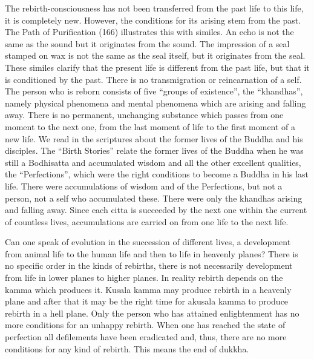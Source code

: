 \documentclass{book}
\begin{document}
The rebirth-consciousness has not been transferred from the past life to
this life, it is completely new. However, the conditions for its arising
stem from the past. The Path of Purification (166) illustrates this with
similes. An echo is not the same as the sound but it originates from the
sound. The impression of a seal stamped on wax is not the same as the
seal itself, but it originates from the seal. These similes clarify that
the present life is different from the past life, but that it is
conditioned by the past. There is no transmigration or reincarnation of
a self. The person who is reborn consists of five ``groups of
existence'', the ``khandhas'', namely physical phenomena and mental
phenomena which are arising and falling away. There is no permanent,
unchanging substance which passes from one moment to the next one, from
the last moment of life to the first moment of a new life. We read in
the scriptures about the former lives of the Buddha and his disciples.
The ``Birth Stories'' relate the former lives of the Buddha when he was
still a Bodhisatta and accumulated wisdom and all the other excellent
qualities, the ``Perfections'', which were the right conditions to
become a Buddha in his last life. There were accumulations of wisdom and
of the Perfections, but not a person, not a self who accumulated these.
There were only the khandhas arising and falling away. Since each citta
is succeeded by the next one within the current of countless lives,
accumulations are carried on from one life to the next life.

Can one speak of evolution in the succession of different lives, a
development from animal life to the human life and then to life in
heavenly planes? There is no specific order in the kinds of rebirths,
there is not necessarily develop­ment from life in lower planes to
higher planes. In reality rebirth depends on the kamma which produces
it. Kusala kamma may produce rebirth in a heavenly plane and after that
it may be the right time for akusala kamma to produce rebirth in a hell
plane. Only the person who has attained enlightenment has no more
conditions for an unhappy rebirth. When one has reached the state of
perfection all defilements have been eradicated and, thus, there are no
more conditions for any kind of rebirth. This means the end of dukkha.
\end{document}
